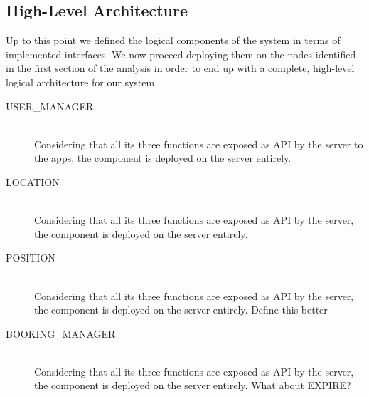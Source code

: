 \documentclass[11pt]{article} %
\begin{document}
\begin{description}
\begin{description}
\end{description}




\subsection{High-Level Architecture}

Up to this point we defined the logical components of the system in terms of implemented interfaces. We now proceed deploying them on the nodes identified in the first section of the analysis in order to end up with a complete, high-level logical architecture for our system.


\begin{description}
	\item[USER\_MANAGER] \hfill \\
	Considering that all its three functions are exposed as API by the server to the apps, the component is deployed on the server entirely.
		
	\item[LOCATION] \hfill \\
	Considering that all its three functions are exposed as API by the server, the component is deployed on the server entirely.

	\item[POSITION] \hfill \\
	Considering that all its three functions are exposed as API by the server, the component is deployed on the server entirely. {\color{red} {Define this better}}
	
	\item[BOOKING\_MANAGER] \hfill \\
	Considering that all its three functions are exposed as API by the server, the component is deployed on the server entirely. {\color{red} {What about EXPIRE?}}
	

\end{description}
\end{description}
\end{document}
